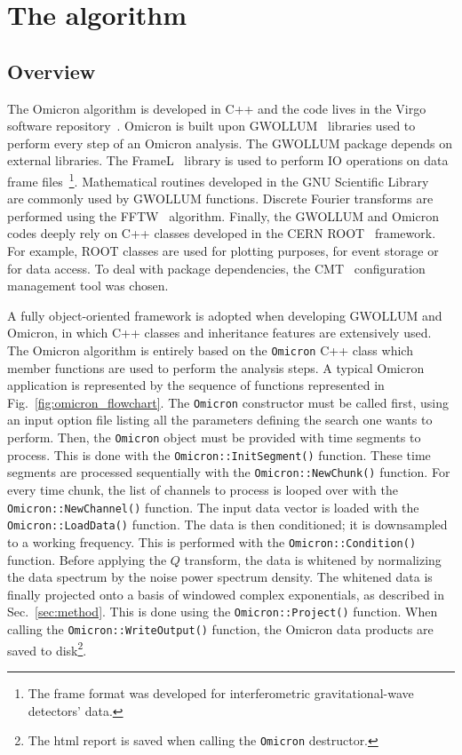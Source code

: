 \section{The algorithm} \label{sec:algorithm}

\subsection{Overview} \label{sec:algorithm:overview}
The Omicron algorithm is developed in C++ and the code lives in the Virgo software repository~\cite{VirgoSVN}. Omicron is built upon GWOLLUM~\cite{GWOLLUM} libraries used to perform every step of an Omicron analysis. The GWOLLUM package depends on external libraries. The FrameL~\cite{FrameL} library is used to perform IO operations on data frame files~\footnote{The frame format was developed for interferometric gravitational-wave detectors' data.}. Mathematical routines developed in the GNU Scientific Library~\cite{GSL} are commonly used by GWOLLUM functions. Discrete Fourier transforms are performed using the FFTW~\cite{FFTW} algorithm. Finally, the GWOLLUM and Omicron codes deeply rely on C++ classes developed in the CERN ROOT~\cite{Brun:1997pa} framework. For example, ROOT classes are used for plotting purposes, for event storage or for data access. To deal with package dependencies, the CMT~\cite{CMT} configuration management tool was chosen.

A fully object-oriented framework is adopted when developing GWOLLUM and Omicron, in which C++ classes and inheritance features are extensively used. The Omicron algorithm is entirely based on the \texttt{Omicron} C++ class which member functions are used to perform the analysis steps. A typical Omicron application is represented by the sequence of functions represented in Fig.~\ref{fig:omicron_flowchart}. The \texttt{Omicron} constructor must be called first, using an input option file listing all the parameters defining the search one wants to perform. Then, the \texttt{Omicron} object must be provided with time segments to process. This is done with the \texttt{Omicron::InitSegment()} function. These time segments are processed sequentially with the \texttt{Omicron::NewChunk()} function. For every time chunk, the list of channels to process is looped over with the \texttt{Omicron::NewChannel()} function. The input data vector is loaded with the \texttt{Omicron::LoadData()} function. The data is then conditioned; it is downsampled to a working frequency. This is performed with the  \texttt{Omicron::Condition()} function. Before applying the $Q$ transform, the data is whitened by normalizing the data spectrum by the noise power spectrum density. The whitened data is finally projected onto a basis of windowed complex exponentials, as described in Sec.~\ref{sec:method}. This is done using the \texttt{Omicron::Project()} function. When calling the \texttt{Omicron::WriteOutput()} function, the Omicron data products are saved to disk\footnote{The html report is saved when calling the \texttt{Omicron} destructor.}.

